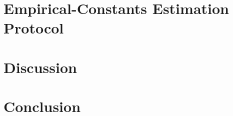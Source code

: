 \documentclass[11pt,a4paper]{article}
\def\SHAREDLATEX{../../latex}
\newcommand{\headlip}{L_H}                      %
\newcommand{\deplag}{\Delta}                    %
\newcommand{\klcoef}{\mu}                       %
\newcommand{\composite}{\stab^{\mathrm{comp}}}  %
\begin{document}
\section{Empirical-Constants Estimation Protocol}
\label{sec:constants}

\section{Discussion}
\label{sec:discussion}

\section{Conclusion}
\label{sec:conclusion}

\nocite{borkar2008stochastic}
\nocite{tsitsiklis1997td}
\nocite{bishop2006prml}


\end{document}
